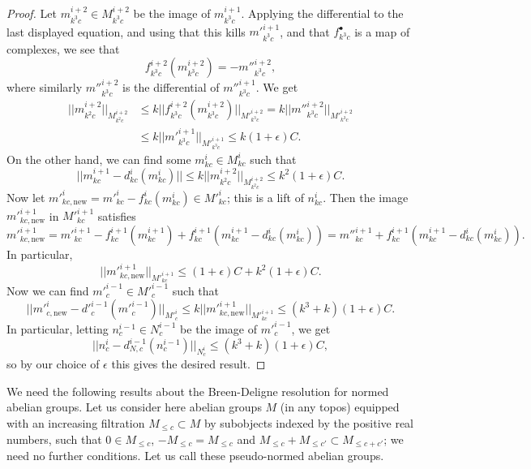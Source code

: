 \documentclass[11pt]{amsart}
\numberwithin{equation}{section}
\numberwithin{theorem}{section}
\theoremstyle{definition}
\begin{document}
\begin{proof}
Let $m^{i+2}_{k^3c}\in M^{i+2}_{k^3c}$ be the image of $m^{i+1}_{k^3c}$. Applying the differential to the last displayed equation, and using that this kills $m'^{i+1}_{k^3c}$, and that $f^\bullet_{k^3c}$ is a map of complexes, we see that
\[
f^{i+2}_{k^3c}(m^{i+2}_{k^3c}) = -m''^{i+2}_{k^3c},
\]
where similarly $m''^{i+2}_{k^3c}$ is the differential of $m''^{i+1}_{k^3c}$. We get
\[\begin{aligned}
||m^{i+2}_{k^2c}||_{M^{i+2}_{k^2c}}&\leq k||f^{i+2}_{k^3c}(m^{i+2}_{k^3c})||_{M'^{i+2}_{k^3c}} = k||m''^{i+2}_{k^3c}||_{M'^{i+2}_{k^3c}}\\
&\leq k||m'^{i+1}_{k^3c}||_{M'^{i+1}_{k^3c}}\leq k(1+\epsilon)C.
\end{aligned}\]
On the other hand, we can find some $m^i_{kc}\in M^i_{kc}$ such that
\[
||m^{i+1}_{kc}-d^i_{kc}(m^i_{kc})||\leq k||m^{i+2}_{k^2c}||_{M^{i+2}_{k^2c}}\leq k^2(1+\epsilon)C.
\]
Now let $m'^i_{kc,\mathrm{new}} = m'^i_{kc}-f^i_{kc}(m^i_{kc})\in M'^i_{kc}$; this is a lift of $n^i_{kc}$. Then the image $m'^{i+1}_{kc,\mathrm{new}}$ in $M'^{i+1}_{kc}$ satisfies
\[
m'^{i+1}_{kc,\mathrm{new}} = m'^{i+1}_{kc}-f^{i+1}_{kc}(m^{i+1}_{kc}) + f^{i+1}_{kc}(m^{i+1}_{kc}-d^i_{kc}(m^i_{kc})) = m''^{i+1}_{kc} + f^{i+1}_{kc}(m^{i+1}_{kc}-d^i_{kc}(m^i_{kc})).
\]
In particular,
\[
||m'^{i+1}_{kc,\mathrm{new}}||_{M'^{i+1}_{kc}}\leq (1+\epsilon)C+ k^2(1+\epsilon)C.
\]
Now we can find $m'^{i-1}_c\in M'^{i-1}_c$ such that
\[
||m'^i_{c,\mathrm{new}} - d'^{i-1}_c(m'^{i-1}_c)||_{M'^i_c}\leq k||m'^{i+1}_{kc,\mathrm{new}}||_{M'^{i+1}_{kc}}\leq (k^3+k)(1+\epsilon)C.
\]
In particular, letting $n^{i-1}_c\in N^{i-1}_c$ be the image of $m'^{i-1}_c$, we get
\[
||n^i_c - d^{i-1}_{N,c}(n^{i-1}_c)||_{N^i_c}\leq (k^3+k)(1+\epsilon)C,
\]
so by our choice of $\epsilon$ this gives the desired result.
\end{proof}

We need the following results about the Breen-Deligne resolution for normed abelian groups. Let us consider here abelian groups $M$ (in any topos) equipped with an increasing filtration $M_{\leq c}\subset M$ by subobjects indexed by the positive real numbers, such that $0\in M_{\leq c}$, $-M_{\leq c} = M_{\leq c}$ and $M_{\leq c}+M_{\leq c'}\subset M_{\leq c+c'}$; we need no further conditions. Let us call these pseudo-normed abelian groups.
\end{document}
